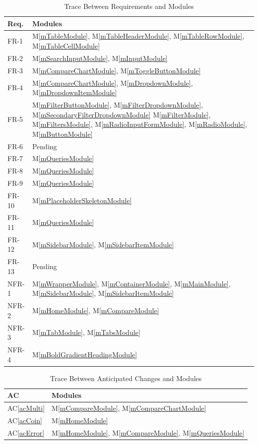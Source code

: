 \documentclass[12pt, titlepage]{article}
\newcommand{\acref}[1]{AC\ref{#1}}
\newcommand{\mref}[1]{M\ref{#1}}
\begin{document}
\begin{table}[H]
\centering
\begin{tabular}{p{} p{}}
\toprule
\textbf{Req.} & \textbf{Modules}\\
\midrule
FR-1 & \mref{mTableModule}, \mref{mTableHeaderModule}, \mref{mTableRowModule}, \mref{mTableCellModule}\\
FR-2 & \mref{mSearchInputModule}, \mref{mInputModule}\\
FR-3 & \mref{mCompareChartModule}, \mref{mToggleButtonModule}\\
FR-4 & \mref{mCompareChartModule}, \mref{mDropdownModule}, \mref{mDropdownItemModule}\\
FR-5 & \mref{mFilterButtonModule}, \mref{mFilterDropdownModule}, \mref{mSecondaryFilterDropdownModule} \mref{mFilterModule}, \mref{mFiltersModule}, \mref{mRadioInputFormModule}, \mref{mRadioModule}, \mref{mButtonModule}\\
FR-6 & Pending\\
FR-7 & \mref{mQueriesModule}\\
FR-8 & \mref{mQueriesModule}\\
FR-9 & \mref{mQueriesModule}\\
FR-10 & \mref{mPlaceholderSkeletonModule}\\
FR-11 & \mref{mQueriesModule}\\
FR-12 & \mref{mSidebarModule}, \mref{mSidebarItemModule}\\
FR-13 & Pending\\

NFR-1 & \mref{mWrapperModule}, \mref{mContainerModule}, \mref{mMainModule}, \mref{mSidebarModule}, \mref{mSidebarItemModule}\\
NFR-2 & \mref{mHomeModule}, \mref{mCompareModule}\\
NFR-3 & \mref{mTabModule}, \mref{mTabsModule}\\
NFR-4 & \mref{mBoldGradientHeadingModule}\\
\bottomrule
\end{tabular}
\caption{Trace Between Requirements and Modules}
\label{TblRT}
\end{table}

\begin{table}[H]
\centering
\begin{tabular}{p{} p{}}
\toprule
\textbf{AC} & \textbf{Modules}\\
\midrule
\acref{acMulti} & \mref{mCompareModule}, \mref{mCompareChartModule}\\
\acref{acCoin} & \mref{mHomeModule}\\
\acref{acError} & \mref{mHomeModule}, \mref{mCompareModule}, \mref{mQueriesModule} \\
\bottomrule
\end{tabular}
\caption{Trace Between Anticipated Changes and Modules}
\label{TblACT}
\end{table}
\end{document}
